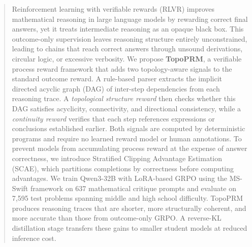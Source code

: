 \begin{abstract}
Reinforcement learning with verifiable rewards (RLVR) improves
mathematical reasoning in large language models by rewarding correct
final answers, yet it treats intermediate reasoning as an opaque
black box. This outcome-only supervision leaves reasoning structure
entirely unconstrained, leading to chains that reach correct answers
through unsound derivations, circular logic, or excessive verbosity.
We propose \textbf{TopoPRM}, a verifiable process reward framework
that adds two topology-aware signals to the standard outcome reward.
A rule-based parser extracts the implicit directed acyclic graph (DAG)
of inter-step dependencies from each reasoning trace. A
\emph{topological structure reward} then checks whether this DAG
satisfies acyclicity, connectivity, and directional consistency, while
a \emph{continuity reward} verifies that each step references
expressions or conclusions established earlier. Both signals are
computed by deterministic programs and require no learned reward model
or human annotations. To prevent models from accumulating process reward
at the expense of answer correctness, we introduce Stratified Clipping
Advantage Estimation (SCAE), which partitions completions by
correctness before computing advantages. We train Qwen3-32B with
LoRA-based GRPO using the MS-Swift framework on 637 mathematical
critique prompts and evaluate on 7{,}595 test problems spanning middle
and high school difficulty. TopoPRM produces reasoning traces that
are shorter, more structurally coherent, and more accurate than
those from outcome-only GRPO. A reverse-KL distillation stage transfers
these gains to smaller student models at reduced inference cost.
\end{abstract}
